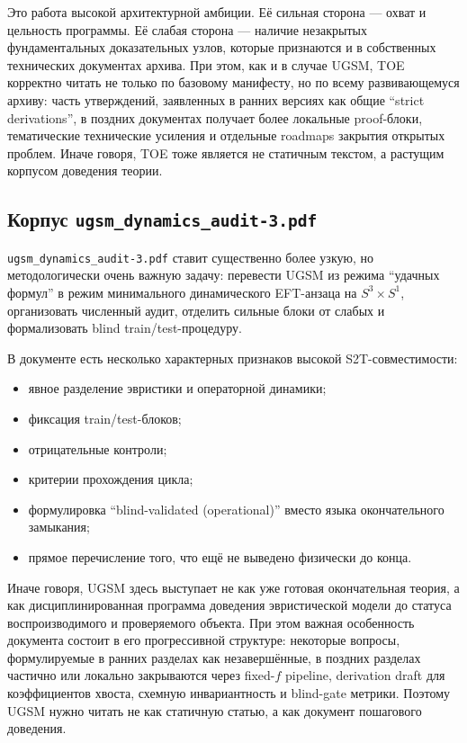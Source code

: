 \documentclass[12pt,a4paper]{article}
\begin{document}
Это работа высокой архитектурной амбиции. Её сильная сторона --- охват и цельность программы. Её слабая сторона --- наличие незакрытых фундаментальных доказательных узлов, которые признаются и в собственных технических документах архива. При этом, как и в случае UGSM, TOE корректно читать не только по базовому манифесту, но по всему развивающемуся архиву: часть утверждений, заявленных в ранних версиях как общие ``strict derivations'', в поздних документах получает более локальные proof-блоки, тематические технические усиления и отдельные roadmaps закрытия открытых проблем. Иначе говоря, TOE тоже является не статичным текстом, а растущим корпусом доведения теории.

\subsection{Корпус \texttt{ugsm\_dynamics\_audit-3.pdf}}

\texttt{ugsm\_dynamics\_audit-3.pdf} ставит существенно более узкую, но методологически очень важную задачу: перевести UGSM из режима ``удачных формул'' в режим минимального динамического EFT-анзаца на \(S^3 \times S^1\), организовать численный аудит, отделить сильные блоки от слабых и формализовать blind train/test-процедуру.

В документе есть несколько характерных признаков высокой S2T-совместимости:
\begin{itemize}
    \item явное разделение эвристики и операторной динамики;
    \item фиксация train/test-блоков;
    \item отрицательные контроли;
    \item критерии прохождения цикла;
    \item формулировка ``blind-validated (operational)'' вместо языка окончательного замыкания;
    \item прямое перечисление того, что ещё не выведено физически до конца.
\end{itemize}

Иначе говоря, UGSM здесь выступает не как уже готовая окончательная теория, а как дисциплинированная программа доведения эвристической модели до статуса воспроизводимого и проверяемого объекта. При этом важная особенность документа состоит в его прогрессивной структуре: некоторые вопросы, формулируемые в ранних разделах как незавершённые, в поздних разделах частично или локально закрываются через fixed-$f$ pipeline, derivation draft для коэффициентов хвоста, схемную инвариантность и blind-gate метрики. Поэтому UGSM нужно читать не как статичную статью, а как документ пошагового доведения.
\end{document}
